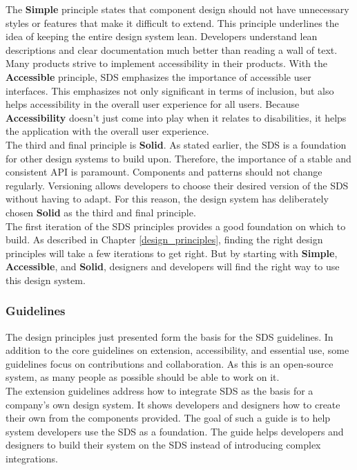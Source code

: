 The \textbf{Simple} principle states that component design should not have unnecessary styles or features that make it difficult to extend. This principle underlines the idea of keeping the entire design system lean. Developers understand lean descriptions and clear documentation much better than reading a wall of text. \\

Many products strive to implement accessibility in their products. With the \textbf{Accessible} principle, \ac{SDS} emphasizes the importance of accessible user interfaces. This emphasizes not only significant in terms of inclusion, but also helps accessibility in the overall user experience for all users. Because \textbf{Accessibility} doesn't just come into play when it relates to disabilities, it helps the application with the overall user experience. \\

The third and final principle is \textbf{Solid}. As stated earlier, the \ac{SDS} is a foundation for other design systems to build upon. Therefore, the importance of a stable and consistent API is paramount. Components and patterns should not change regularly. Versioning allows developers to choose their desired version of the \ac{SDS} without having to adapt. For this reason, the design system has deliberately chosen \textbf{Solid} as the third and final principle. \\

The first iteration of the \acl{SDS} principles provides a good foundation on which to build. As described in Chapter \ref{design_principles}, finding the right design principles will take a few iterations to get right. But by starting with \textbf{Simple}, \textbf{Accessible}, and \textbf{Solid}, designers and developers will find the right way to use this design system.
\subsubsection{Guidelines}
The design principles just presented form the basis for the \ac{SDS} guidelines. In addition to the core guidelines on extension, accessibility, and essential use, some guidelines focus on contributions and collaboration. As this is an open-source system, as many people as possible should be able to work on it. \\

The extension guidelines address how to integrate \ac{SDS} as the basis for a company's own design system. It shows developers and designers how to create their own from the components provided. The goal of such a guide is to help system developers use the SDS as a foundation. The guide helps developers and designers to build their system on the SDS instead of introducing complex integrations. \\

